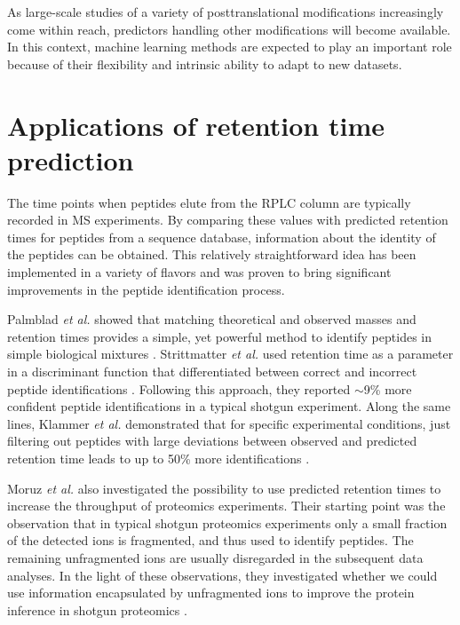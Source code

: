 \documentclass[a4paper]{article}
\begin{document}
As large-scale studies of a variety of posttranslational modifications
increasingly come within reach, predictors
handling other modifications will become available. In this context,
machine learning methods are expected to play an important role
because of their flexibility and intrinsic ability to adapt to new
datasets.


\section{\label{sec:app}Applications of retention time prediction}

The time points when peptides elute from the RPLC column are typically
recorded in MS experiments. By comparing these values with predicted
retention times for peptides from a sequence database, information
about the identity of the peptides can be obtained. This relatively
straightforward idea has been implemented in a variety of flavors and
was proven to bring significant improvements in the peptide
identification process.


Palmblad {\em et al.} showed that matching theoretical and observed
masses and retention times provides a simple, yet powerful method to
identify peptides in simple biological mixtures
\cite{palmblad2002prediction}. Strittmatter {\em et al.} used
retention time as a parameter in a discriminant function that
differentiated between correct and incorrect peptide identifications
\cite{Strittmatter2004}. Following this approach, they reported
$\sim$9\% more confident peptide identifications in a typical shotgun
experiment. Along the same lines, Klammer {\em et al.} demonstrated
that for specific experimental conditions, just filtering out peptides
with large deviations between observed and predicted retention time
leads to up to 50\% more identifications \cite{klammer2007improving}. 



Moruz {\em et al.} also investigated the possibility to use predicted
retention times to increase the throughput of proteomics
experiments. Their starting point was the observation that in typical
shotgun proteomics experiments only a small fraction of the detected
ions is fragmented, and thus used to identify peptides. The remaining
unfragmented ions are usually disregarded in the subsequent data
analyses. In the light of these observations, they investigated
whether we could use information encapsulated by unfragmented ions to
improve the protein inference in shotgun proteomics \cite{mf}.
\end{document}
